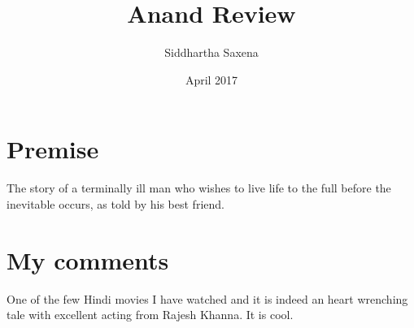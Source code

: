 \documentclass{article}
\title{Anand Review}
\author{Siddhartha Saxena}
\date{April 2017}
\begin{document}
\maketitle

\section{Premise}
The story of a terminally ill man who wishes to live life to the full before the inevitable occurs, as told by his best friend.
\section{My comments}
One of the few Hindi movies I have watched and it is indeed an heart wrenching tale with excellent acting from Rajesh Khanna.
It is cool.
\end{document}
